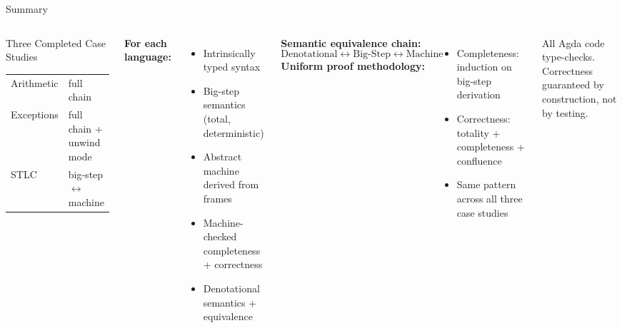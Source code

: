 \documentclass[10pt,compress,aspectratio=169]{beamer}
\begin{document}
\begin{frame}{Summary}
  \begin{columns}[T]
      \begin{block}{Three Completed Case Studies}
        \begin{tabular}{ll}
          Arithmetic  & full chain \\
          Exceptions  & full chain + unwind mode \\
          STLC        & big-step $\leftrightarrow$ machine \\
        \end{tabular}
      \end{block}
      \medskip
      \textbf{For each language:}
      \begin{itemize}
        \item Intrinsically typed syntax
        \item Big-step semantics (total, deterministic)
        \item Abstract machine derived from frames
        \item Machine-checked completeness + correctness
        \item Denotational semantics + equivalence
      \end{itemize}
      \textbf{Semantic equivalence chain:}
      \[
        \text{Denotational} \leftrightarrow \text{Big-Step} \leftrightarrow \text{Machine}
      \]
      \medskip
      \textbf{Uniform proof methodology:}
      \begin{itemize}
        \item Completeness: induction on big-step derivation
        \item Correctness: totality + completeness + confluence
        \item Same pattern across all three case studies
      \end{itemize}
      \medskip
      \alert{All Agda code type-checks.}\\[3pt]
      {\footnotesize Correctness guaranteed by construction, not by testing.}
  \end{columns}
\end{frame}
\end{document}
